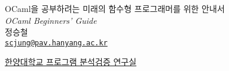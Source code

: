 \thispagestyle{empty}


\newcommand*{\titleSW}{\begingroup%
\raggedleft
\vspace*{\baselineskip}
{\Huge \sffamily OCaml을 공부하려는
미래의 함수형 프로그래머를 위한
안내서}\\[\baselineskip]
{\large\itshape OCaml Beginners' Guide}\\[0.2\textheight]
{\Large 정승철\\
\href{mailto:scjung@pav.hanyang.ac.kr}{\texttt{scjung@pav.hanyang.ac.kr}}
}\par
\vfill
{\Large \sffamily \href{http://pav.hanyang.ac.kr}{한양대학교 프로그램 분석검증 연구실}}
\vspace*{\baselineskip}
\endgroup}

\titleSW
\newpage

\setcounter{page}{1}

